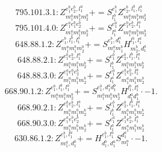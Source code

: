 \documentclass[letterpaper,10pt,fleqn,leqno,onecolumn]{article}
\begin{document}
\begin{equation} \;\;\;\;\;\;  795.101.3.1: Z^{e_{1}^{b}e_{2}^{b},l_{1}^{a}}_{m_{1}^{a}m_{1}^{b}m_{2}^{b}}+=S^{e_{1}^{b}}_{l_{1}^{b}}Z^{e_{2}^{b},l_{1}^{b},l_{1}^{a}}_{m_{1}^{a}m_{1}^{b}m_{2}^{b}} \end{equation}
\begin{equation} \;\;\;\;\;\;  795.101.4.0: Z^{e_{1}^{a}e_{1}^{b}e_{2}^{b}}_{m_{1}^{a}m_{1}^{b}m_{2}^{b}}+=S^{e_{1}^{a}}_{l_{1}^{a}}Z^{e_{1}^{b}e_{2}^{b},l_{1}^{a}}_{m_{1}^{a}m_{1}^{b}m_{2}^{b}} \end{equation}
\begin{equation} \;\;\;\;\;\;  648.88.1.2: Z^{e_{1}^{b},l_{1}^{b},l_{1}^{a}}_{m_{1}^{a}m_{1}^{b}m_{2}^{b}}+=S^{e_{1}^{b},d_{1}^{a}}_{m_{1}^{a}m_{1}^{b}}H^{l_{1}^{b},l_{1}^{a}}_{m_{2}^{b},d_{1}^{a}} \end{equation}
\begin{equation} \;\;\;\;\;\;  648.88.2.1: Z^{e_{1}^{b}e_{2}^{b},l_{1}^{a}}_{m_{1}^{a}m_{1}^{b}m_{2}^{b}}+=S^{e_{1}^{b}}_{l_{1}^{b}}Z^{e_{2}^{b},l_{1}^{b},l_{1}^{a}}_{m_{1}^{a}m_{1}^{b}m_{2}^{b}} \end{equation}
\begin{equation} \;\;\;\;\;\;  648.88.3.0: Z^{e_{1}^{a}e_{1}^{b}e_{2}^{b}}_{m_{1}^{a}m_{1}^{b}m_{2}^{b}}+=S^{e_{1}^{a}}_{l_{1}^{a}}Z^{e_{1}^{b}e_{2}^{b},l_{1}^{a}}_{m_{1}^{a}m_{1}^{b}m_{2}^{b}} \end{equation}
\begin{equation} \;\;\;\;\;\;  668.90.1.2: Z^{e_{1}^{b},l_{1}^{b},l_{1}^{a}}_{m_{1}^{a}m_{1}^{b}m_{2}^{b}}+=S^{e_{1}^{b},d_{1}^{a}d_{1}^{b}}_{m_{1}^{a}m_{1}^{b}m_{2}^{b}}H^{l_{1}^{b},l_{1}^{a}}_{d_{1}^{a}d_{1}^{b}}\cdot -1. \end{equation}
\begin{equation} \;\;\;\;\;\;  668.90.2.1: Z^{e_{1}^{b}e_{2}^{b},l_{1}^{a}}_{m_{1}^{a}m_{1}^{b}m_{2}^{b}}+=S^{e_{1}^{b}}_{l_{1}^{b}}Z^{e_{2}^{b},l_{1}^{b},l_{1}^{a}}_{m_{1}^{a}m_{1}^{b}m_{2}^{b}} \end{equation}
\begin{equation} \;\;\;\;\;\;  668.90.3.0: Z^{e_{1}^{a}e_{1}^{b}e_{2}^{b}}_{m_{1}^{a}m_{1}^{b}m_{2}^{b}}+=S^{e_{1}^{a}}_{l_{1}^{a}}Z^{e_{1}^{b}e_{2}^{b},l_{1}^{a}}_{m_{1}^{a}m_{1}^{b}m_{2}^{b}} \end{equation}
\begin{equation} \;\;\;\;\;\;  630.86.1.2: Z^{e_{1}^{b},l_{1}^{a}}_{m_{1}^{a},d_{1}^{b}}+=H^{e_{1}^{b},l_{1}^{a}}_{d_{1}^{b},d_{1}^{a}}S^{d_{1}^{a}}_{m_{1}^{a}}\cdot -1. \end{equation}
\end{document}
